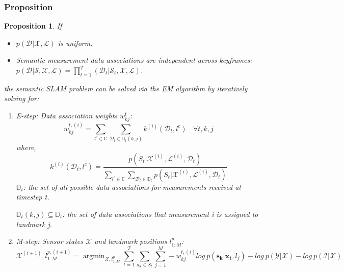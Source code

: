 \documentclass[12pt]{article}
\DeclareMathOperator*{\argmin}{argmin} %
\numberwithin{equation}{section}
\newtheorem{Proposition}{Proposition}
\begin{document}
\subsubsection{Proposition}
\begin{Proposition}
	If
	\begin{itemize}
		\item $p(\mathcal{D}|\mathcal{X},\mathcal{L})$ is uniform.
		\item Semantic measurement data associations are independent across keyframes: $p(\mathcal{D}|\mathcal{S},\mathcal{X},\mathcal{L})=\prod^T_{t=1}(\mathcal{D}_t|\mathcal{S}_t,\mathcal{X},\mathcal{L})$.
	\end{itemize}
	the semantic SLAM problem can be solved via the EM algorithm by iteratively solving for:
	\begin{enumerate}
		\item E-step: Data association weights $w^t_{kj}$:
		\begin{equation}
			w^{t,(i)}_{kj}=\sum_{l^c \in \mathbb{C}} \sum_{\mathcal{D}_t \in \mathbb{D}_t(k,j)} k^{(i)}(\mathcal{D}_t, l^c) \ \ \ \ \forall t, k, j
		\end{equation}
		where,
		\begin{equation}
			k^{(i)}(\mathcal{D}_t,l^c)=\frac{p(S_t|\mathcal{X}^{(i)},\mathcal{L}^{(i)}, \mathcal{D}_t)}{\sum_{l^c \in \mathbb{C}} \sum_{\mathcal{D}_t \in \mathbb{D}_t} p(S_t|\mathcal{X}^{(i)},\mathcal{L}^{(i)}, \mathcal{D}_t)}
		\end{equation}
		$\mathbb{D}_t$: the set of all possible data associations for measurements received at timestep t. \par
		$\mathbb{D}_t(k,j) \subseteq \mathbb{D}_t$: the set of data associations that measurement i is assigned to landmark j. 
		\item M-step: Sensor states $\mathcal{X}$ and landmark positions $l^p_{1:M}$:
		\begin{equation} \label{eq:mstep}
			\mathcal{X}^{(i+1)}, {l}^{p,(i+1)}_{1:M}=\argmin_{\mathcal{X}, l^p_{1:M}} \sum^T_{t=1} \sum_{\bm{s_k} \in S_t} \sum^M_{j=1} -w^{t,(i)}_{kj} log \ p(\bm{s_k}|\bm{x_t}, l_j) - log\ p(\mathcal{Y}|\mathcal{X}) - log\ p(\mathcal{I}|\mathcal{X})
		\end{equation}
	\end{enumerate}	
\end{Proposition} \par
\end{document}
